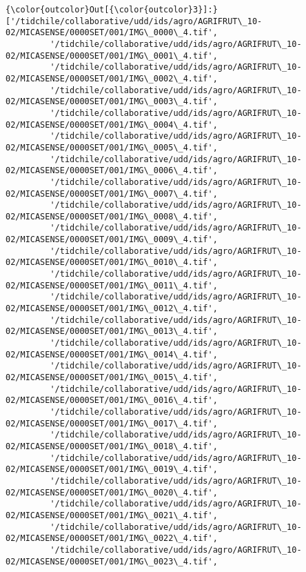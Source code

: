 \documentclass[11pt]{article}
\begin{document}
\begin{Verbatim}[commandchars=\\\{\}]
{\color{outcolor}Out[{\color{outcolor}3}]:} ['/tidchile/collaborative/udd/ids/agro/AGRIFRUT\_10-02/MICASENSE/0000SET/001/IMG\_0000\_4.tif',
         '/tidchile/collaborative/udd/ids/agro/AGRIFRUT\_10-02/MICASENSE/0000SET/001/IMG\_0001\_4.tif',
         '/tidchile/collaborative/udd/ids/agro/AGRIFRUT\_10-02/MICASENSE/0000SET/001/IMG\_0002\_4.tif',
         '/tidchile/collaborative/udd/ids/agro/AGRIFRUT\_10-02/MICASENSE/0000SET/001/IMG\_0003\_4.tif',
         '/tidchile/collaborative/udd/ids/agro/AGRIFRUT\_10-02/MICASENSE/0000SET/001/IMG\_0004\_4.tif',
         '/tidchile/collaborative/udd/ids/agro/AGRIFRUT\_10-02/MICASENSE/0000SET/001/IMG\_0005\_4.tif',
         '/tidchile/collaborative/udd/ids/agro/AGRIFRUT\_10-02/MICASENSE/0000SET/001/IMG\_0006\_4.tif',
         '/tidchile/collaborative/udd/ids/agro/AGRIFRUT\_10-02/MICASENSE/0000SET/001/IMG\_0007\_4.tif',
         '/tidchile/collaborative/udd/ids/agro/AGRIFRUT\_10-02/MICASENSE/0000SET/001/IMG\_0008\_4.tif',
         '/tidchile/collaborative/udd/ids/agro/AGRIFRUT\_10-02/MICASENSE/0000SET/001/IMG\_0009\_4.tif',
         '/tidchile/collaborative/udd/ids/agro/AGRIFRUT\_10-02/MICASENSE/0000SET/001/IMG\_0010\_4.tif',
         '/tidchile/collaborative/udd/ids/agro/AGRIFRUT\_10-02/MICASENSE/0000SET/001/IMG\_0011\_4.tif',
         '/tidchile/collaborative/udd/ids/agro/AGRIFRUT\_10-02/MICASENSE/0000SET/001/IMG\_0012\_4.tif',
         '/tidchile/collaborative/udd/ids/agro/AGRIFRUT\_10-02/MICASENSE/0000SET/001/IMG\_0013\_4.tif',
         '/tidchile/collaborative/udd/ids/agro/AGRIFRUT\_10-02/MICASENSE/0000SET/001/IMG\_0014\_4.tif',
         '/tidchile/collaborative/udd/ids/agro/AGRIFRUT\_10-02/MICASENSE/0000SET/001/IMG\_0015\_4.tif',
         '/tidchile/collaborative/udd/ids/agro/AGRIFRUT\_10-02/MICASENSE/0000SET/001/IMG\_0016\_4.tif',
         '/tidchile/collaborative/udd/ids/agro/AGRIFRUT\_10-02/MICASENSE/0000SET/001/IMG\_0017\_4.tif',
         '/tidchile/collaborative/udd/ids/agro/AGRIFRUT\_10-02/MICASENSE/0000SET/001/IMG\_0018\_4.tif',
         '/tidchile/collaborative/udd/ids/agro/AGRIFRUT\_10-02/MICASENSE/0000SET/001/IMG\_0019\_4.tif',
         '/tidchile/collaborative/udd/ids/agro/AGRIFRUT\_10-02/MICASENSE/0000SET/001/IMG\_0020\_4.tif',
         '/tidchile/collaborative/udd/ids/agro/AGRIFRUT\_10-02/MICASENSE/0000SET/001/IMG\_0021\_4.tif',
         '/tidchile/collaborative/udd/ids/agro/AGRIFRUT\_10-02/MICASENSE/0000SET/001/IMG\_0022\_4.tif',
         '/tidchile/collaborative/udd/ids/agro/AGRIFRUT\_10-02/MICASENSE/0000SET/001/IMG\_0023\_4.tif',

\end{Verbatim}
\end{document}
